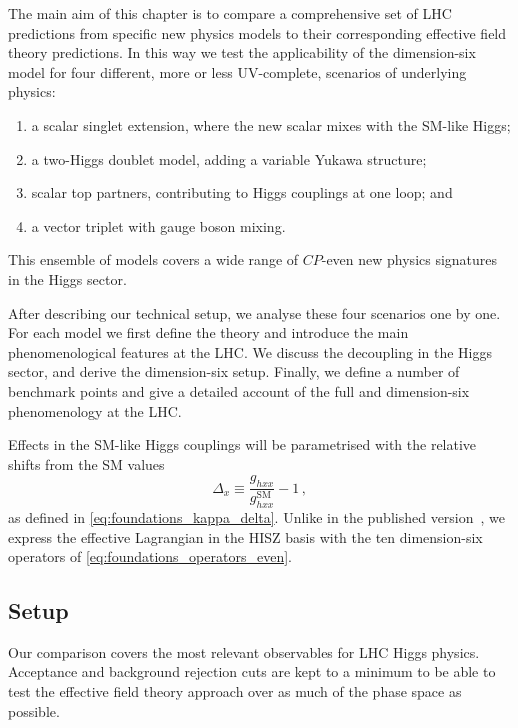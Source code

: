 The main aim of this chapter is to compare a comprehensive set of LHC
predictions from specific new physics models to their corresponding
effective field theory predictions. In this way we test the
applicability of the dimension-six model for four different, more or
less UV-complete, scenarios of underlying physics:
%
\begin{enumerate}
\item a scalar singlet extension, where the new scalar mixes with the SM-like Higgs;
\item a two-Higgs doublet model, adding a variable Yukawa structure;
\item scalar top partners, contributing to Higgs couplings at one
  loop; and
\item a vector triplet with gauge boson mixing.
\end{enumerate}
%
This ensemble of models covers a wide range of $CP$-even new physics
signatures in the Higgs sector.

After describing our technical setup, we analyse these four scenarios
one by one. For each model we first define the theory and introduce
the main phenomenological features at the LHC. We discuss the
decoupling in the Higgs sector, and derive the dimension-six
setup. Finally, we define a number of benchmark points and give a
detailed account of the full and dimension-six phenomenology at the
LHC.

Effects in the SM-like Higgs couplings will be parametrised with the
relative shifts from the SM values
%
\begin{equation}
  \Delta_x \equiv \frac {g_{hxx}} {g_{hxx}^{\text{SM}}} - 1\,,
  \label{eq:validity_delta}
\end{equation}
%
as defined in \autoref{eq:foundations_kappa_delta}. Unlike in the
published version~\cite{Brehmer:2015rna}, we express the effective
Lagrangian in the HISZ basis with the ten dimension-six operators of
\autoref{eq:foundations_operators_even}.



\subsection{Setup}

Our comparison covers the most relevant observables for LHC Higgs
physics. Acceptance and background rejection cuts are kept to a
minimum to be able to test the effective field theory approach over as
much of the phase space as possible.

